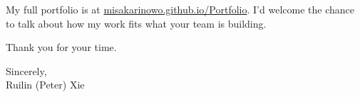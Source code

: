 \documentclass[letterpaper,11pt]{article}
\begin{document}

My full portfolio is at \href{https://misakarinowo.github.io/Portfolio}{misakarinowo.github.io/Portfolio}.
I'd welcome the chance to talk about how my work fits what your team is building.

Thank you for your time.

Sincerely,\\[6pt]
Ruilin (Peter) Xie
\end{document}
